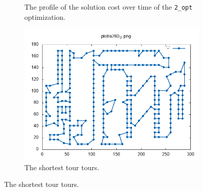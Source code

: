 \begin{figure}[!h]
\begin{subfigure}{.5\columnwidth}
		\caption{The profile of the solution cost over time of the \texttt{2\_opt} optimization.}
		\label{fig:lb_greedy_best_two_opt_a280}
	\end{subfigure}
	\begin{subfigure}{.5\columnwidth}
		\centering
		\includegraphics[width=0.9\columnwidth]{../res/a280_0.png}
		\caption{The shortest tour tours.}
		\label{fig:a280_0}
	\end{subfigure}
\end{figure}

